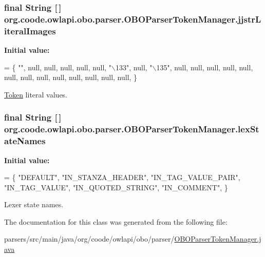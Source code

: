 \hypertarget{classorg_1_1coode_1_1owlapi_1_1obo_1_1parser_1_1_o_b_o_parser_token_manager_a9b4b6c3d22d6299f7d2f30a872ae0fe3}{
\subsubsection[{jjstr\-Literal\-Images}]{\setlength{\rightskip}{0pt plus 5cm}final String \mbox{[}$\,$\mbox{]} org.\-coode.\-owlapi.\-obo.\-parser.\-O\-B\-O\-Parser\-Token\-Manager.\-jjstr\-Literal\-Images\hspace{0.3cm}{\ttfamily [static]}}}\label{classorg_1_1coode_1_1owlapi_1_1obo_1_1parser_1_1_o_b_o_parser_token_manager_a9b4b6c3d22d6299f7d2f30a872ae0fe3}
{\bfseries Initial value\-:}
\begin{DoxyCode}
= \{
        \textcolor{stringliteral}{""}, null, null, null, null, null, \textcolor{stringliteral}{"\(\backslash\)133"}, null, \textcolor{stringliteral}{"\(\backslash\)135"}, null, null, null, null,
        null, null, null, null, null, null, null, null, null, \}
\end{DoxyCode}
\hyperlink{classorg_1_1coode_1_1owlapi_1_1obo_1_1parser_1_1_token}{Token} literal values. \hypertarget{classorg_1_1coode_1_1owlapi_1_1obo_1_1parser_1_1_o_b_o_parser_token_manager_aad761396c555fc71fccafa5a4b27637e}{
\subsubsection[{lex\-State\-Names}]{\setlength{\rightskip}{0pt plus 5cm}final String \mbox{[}$\,$\mbox{]} org.\-coode.\-owlapi.\-obo.\-parser.\-O\-B\-O\-Parser\-Token\-Manager.\-lex\-State\-Names\hspace{0.3cm}{\ttfamily [static]}}}\label{classorg_1_1coode_1_1owlapi_1_1obo_1_1parser_1_1_o_b_o_parser_token_manager_aad761396c555fc71fccafa5a4b27637e}
{\bfseries Initial value\-:}
\begin{DoxyCode}
= \{
        \textcolor{stringliteral}{"DEFAULT"},
        \textcolor{stringliteral}{"IN\_STANZA\_HEADER"},
        \textcolor{stringliteral}{"IN\_TAG\_VALUE\_PAIR"},
        \textcolor{stringliteral}{"IN\_TAG\_VALUE"},
        \textcolor{stringliteral}{"IN\_QUOTED\_STRING"},
        \textcolor{stringliteral}{"IN\_COMMENT"},
    \}
\end{DoxyCode}
Lexer state names. 

The documentation for this class was generated from the following file\-:\begin{DoxyCompactItemize}
\item 
parsers/src/main/java/org/coode/owlapi/obo/parser/\hyperlink{_o_b_o_parser_token_manager_8java}{O\-B\-O\-Parser\-Token\-Manager.\-java}\end{DoxyCompactItemize}
